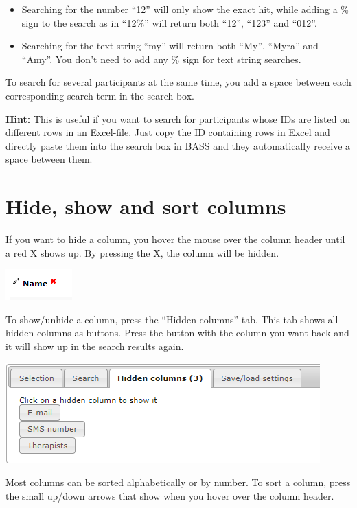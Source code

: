 \documentclass[]{book}
\begin{document}
\begin{itemize}
\item
  Searching for the number ``12'' will only show the exact hit, while adding a \% sign to the search as in ``12\%'' will return both ``12'', ``123'' and ``012''.
\item
  Searching for the text string ``my'' will return both ``My'', ``Myra'' and ``Amy''. You don't need to add any \% sign for text string searches.
\end{itemize}

To search for several participants at the same time, you add a space between each corresponding search term in the search box.

\textbf{Hint:} This is useful if you want to search for participants whose IDs are listed on different rows in an Excel-file. Just copy the ID containing rows in Excel and directly paste them into the search box in BASS and they automatically receive a space between them.

\hypertarget{hide-show-and-sort-columns}{%
\section{Hide, show and sort columns}\label{hide-show-and-sort-columns}}

If you want to hide a column, you hover the mouse over the column header until a red X shows up. By pressing the X, the column will be hidden.

\includegraphics{images/hide-show-sort.png}

To show/unhide a column, press the ``Hidden columns'' tab. This tab shows all hidden columns as buttons. Press the button with the column you want back and it will show up in the search results again.

\includegraphics{images/hidden-columns.png}

Most columns can be sorted alphabetically or by number. To sort a column, press the small up/down arrows that show when you hover over the column header.
\end{document}
